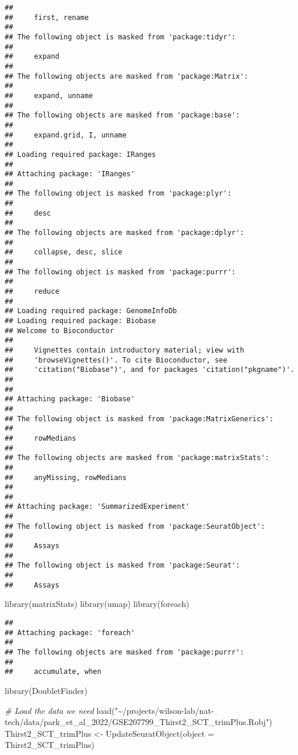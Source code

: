 \documentclass[
]{article}
\newenvironment{Shaded}{\begin{snugshade}}{\end{snugshade}}
\newcommand{\AttributeTok}[1]{\textcolor[rgb]{0.77,0.63,0.00}{#1}}
\newcommand{\CommentTok}[1]{\textcolor[rgb]{0.56,0.35,0.01}{\textit{#1}}}
\newcommand{\FunctionTok}[1]{\textcolor[rgb]{0.00,0.00,0.00}{#1}}
\newcommand{\NormalTok}[1]{#1}
\newcommand{\OtherTok}[1]{\textcolor[rgb]{0.56,0.35,0.01}{#1}}
\newcommand{\StringTok}[1]{\textcolor[rgb]{0.31,0.60,0.02}{#1}}
\begin{document}
\begin{verbatim}
## 
##     first, rename
## 
## The following object is masked from 'package:tidyr':
## 
##     expand
## 
## The following objects are masked from 'package:Matrix':
## 
##     expand, unname
## 
## The following objects are masked from 'package:base':
## 
##     expand.grid, I, unname
## 
## Loading required package: IRanges
## 
## Attaching package: 'IRanges'
## 
## The following object is masked from 'package:plyr':
## 
##     desc
## 
## The following objects are masked from 'package:dplyr':
## 
##     collapse, desc, slice
## 
## The following object is masked from 'package:purrr':
## 
##     reduce
## 
## Loading required package: GenomeInfoDb
## Loading required package: Biobase
## Welcome to Bioconductor
## 
##     Vignettes contain introductory material; view with
##     'browseVignettes()'. To cite Bioconductor, see
##     'citation("Biobase")', and for packages 'citation("pkgname")'.
## 
## 
## Attaching package: 'Biobase'
## 
## The following object is masked from 'package:MatrixGenerics':
## 
##     rowMedians
## 
## The following objects are masked from 'package:matrixStats':
## 
##     anyMissing, rowMedians
## 
## 
## Attaching package: 'SummarizedExperiment'
## 
## The following object is masked from 'package:SeuratObject':
## 
##     Assays
## 
## The following object is masked from 'package:Seurat':
## 
##     Assays
\end{verbatim}

\begin{Shaded}
\begin{Highlighting}[]
\FunctionTok{library}\NormalTok{(matrixStats)}
\FunctionTok{library}\NormalTok{(umap)}
\FunctionTok{library}\NormalTok{(foreach)}
\end{Highlighting}
\end{Shaded}

\begin{verbatim}
## 
## Attaching package: 'foreach'
## 
## The following objects are masked from 'package:purrr':
## 
##     accumulate, when
\end{verbatim}

\begin{Shaded}
\begin{Highlighting}[]
\FunctionTok{library}\NormalTok{(DoubletFinder)}

\CommentTok{\# Load the data we need}
\FunctionTok{load}\NormalTok{(}\StringTok{"\textasciitilde{}/projects/wilson{-}lab/nat{-}tech/data/park\_et\_al\_2022/GSE207799\_Thirst2\_SCT\_trimPlus.Robj"}\NormalTok{)}
\NormalTok{Thirst2\_SCT\_trimPlus }\OtherTok{\textless{}{-}} \FunctionTok{UpdateSeuratObject}\NormalTok{(}\AttributeTok{object =}\NormalTok{ Thirst2\_SCT\_trimPlus)}
\end{Highlighting}
\end{Shaded}
\end{document}
